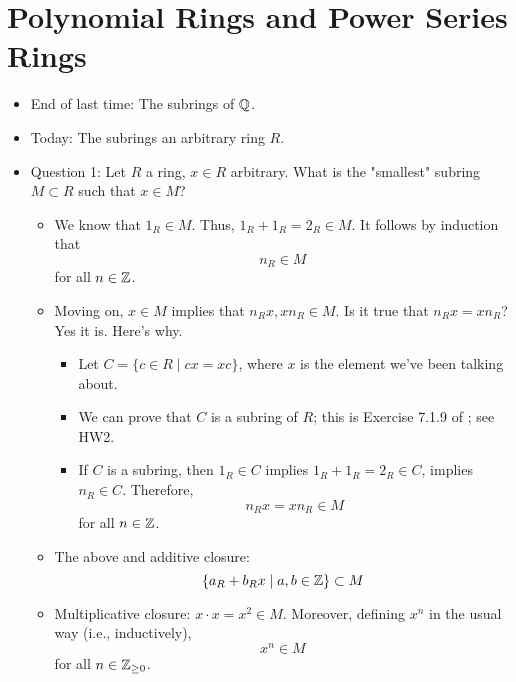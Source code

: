 \documentclass[../notes.tex]{subfiles}
\begin{document}
\section{Polynomial Rings and Power Series Rings}
\begin{itemize}
    \item {}End of last time: The subrings of $\mathbb{Q}$.
    \item Today: The subrings an arbitrary ring $R$.
    \item Question 1: Let $R$ a ring, $x\in R$ arbitrary. What is the "smallest" subring $M\subset R$ such that $x\in M$?
    \begin{itemize}
        \item We know that $1_R\in M$. Thus, $1_R+1_R=2_R\in M$. It follows by induction that
        \begin{equation*}
            n_R \in M
        \end{equation*}
        for all $n\in\mathbb{Z}$.
        \item Moving on, $x\in M$ implies that $n_Rx,xn_R\in M$. Is it true that $n_Rx=xn_R$? Yes it is. Here's why.
        \begin{itemize}
            \item Let $C=\{c\in R\mid cx=xc\}$, where $x$ is the element we've been talking about.
            \item We can prove that $C$ is a subring of $R$; this is Exercise 7.1.9 of \textcite{bib:DummitFoote}; see HW2.
            \item If $C$ is a subring, then $1_R\in C$ implies $1_R+1_R=2_R\in C$, implies $n_R\in C$. Therefore,
            \begin{equation*}
                n_Rx=xn_R \in M
            \end{equation*}
            for all $n\in\mathbb{Z}$.
        \end{itemize}
        \item The above and additive closure:
        \begin{equation*}
            \{a_R+b_Rx\mid a,b\in\mathbb{Z}\} \subset M
        \end{equation*}
        \item Multiplicative closure: $x\cdot x=x^2\in M$. Moreover, defining $x^n$ in the usual way (i.e., inductively),
        \begin{equation*}
            x^n \in M
        \end{equation*}
        for all $n\in{\mathbb{Z}_{\geq 0}}$.
        \begin{itemize}

\end{itemize}
\end{itemize}
\end{itemize}
\end{document}
